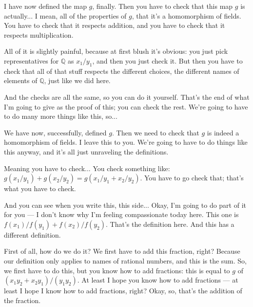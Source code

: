 \begin{speech}[00:29:02 - 00:30:30]
I have now defined the map $g$, finally. Then you have to check that this map $g$ is actually... I mean, all of the properties of $g$, that it's a homomorphism of fields. You have to check that it respects addition, and you have to check that it respects multiplication.

All of it is slightly painful, because at first blush it's obvious: you just pick representatives for $\mathbb{Q}$ as $x_1/y_1$, and then you just check it. But then you have to check that all of that stuff respects the different choices, the different names of elements of $\mathbb{Q}$, just like we did here.

And the checks are all the same, so you can do it yourself. That's the end of what I'm going to give as the proof of this; you can check the rest. We're going to have to do many more things like this, so...
\end{speech}

\begin{speech}[00:30:30 - 00:32:03]
We have now, successfully, defined $g$. Then we need to check that $g$ is indeed a homomorphism of fields.  I leave this to you. We're going to have to do things like this anyway, and it's all just unraveling the definitions.

Meaning you have to check...  You check something like:  $g(x_1/y_1) + g(x_2/y_2) = g(x_1/y_1 + x_2/y_2)$. You have to go check that; that's what you have to check.

And you can see when you write this, this side... Okay, I'm going to do part of it for you --- I don't know why I'm feeling compassionate today here. This one is $f(x_1)/f(y_1) + f(x_2)/f(y_2)$.  That's the definition here. And this has a different definition.

First of all, how do we do it? We first have to add this fraction, right? Because our definition only applies to names of rational numbers, and this is the sum. So, we first have to do this, but you know how to add fractions: this is equal to  $g$ of $(x_1 y_2 + x_2 y_1)/(y_1 y_2)$. At least I hope you know how to add fractions --- at least I hope I know how to add fractions, right? Okay, so, that's the addition of the fraction.
\end{speech}

